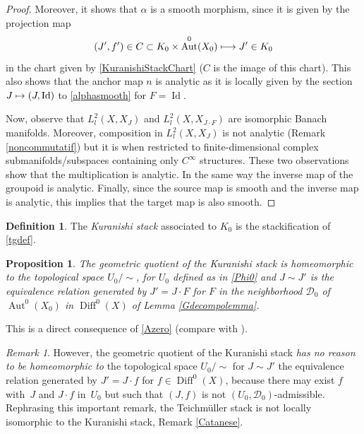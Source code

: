 \documentclass[10pt]{amsart}
\let\mathcal\mathscr
\def\mto{\mathchoice{\longmapsto}{\mapsto}{\mapsto}{\mapsto}}
\DeclareMathOperator{\Aut}{Aut}
\DeclareMathOperator{\Diff}{Diff}
\DeclareMathOperator{\Id}{Id}
\theoremstyle{plain}
\newtheorem{proposition}[theorem]{Proposition}
\theoremstyle{definition}
\newtheorem{definition}[theorem]{Definition}
\theoremstyle{remark}
\newtheorem{remark}[theorem]{Remark}
\numberwithin{equation}{section}
\newcommand{\Azero}{\Aut^0(X_0)}
\newcommand{\D}{\Diff^0(X)}
\begin{document}
\begin{proof}
Moreover, it shows that $\alpha$ is a smooth morphism, since it is given by the projection map
\begin{equation}
\label{alphasmooth}
(J',f')\in C\subset K_0\times\Azero\mto J'\in K_0
\end{equation}
in the chart given by \eqref{KuranishiStackChart} ($C$ is the image of this chart). This also shows that the anchor map $n$ is analytic as it is locally given by the section $J\mto (J,\Id)$ to \eqref{alphasmooth} for $F=\Id$.

Now, observe that $L^2_l(X,X_J)$ and $L^2_l(X,X_{J\cdot F})$ are isomorphic Banach manifolds. Moreover, composition in $L^2_l(X,X_J)$ is not analytic (\cf Remark \ref{noncommutatif}) but it is when restricted to finite-dimensional complex submanifolds/subspaces containing only $C^\infty$ structures. These two observations show that the multiplication is analytic. In the same way the inverse map of the groupoid is analytic. Finally, since the source map is smooth and the inverse map is analytic, this implies that the target map is also smooth.
\end{proof}
\begin{definition}
The \emph{Kuranishi stack} associated to $K_0$ is the stackification of \eqref{tgdef}.
\end{definition}

\begin{proposition}
\label{geometricquotient}
The geometric quotient of the Kuranishi stack is homeomorphic to the topological space $U_0/\sim$, for $U_0$ defined as in \eqref{Phi0} and $J\sim J'$ is the equivalence relation generated by $J'=J\cdot F$ for $F$ in the neighborhood $\mathcal D_0$ of $\Azero$ in $\D$ of Lemma \ref{Gdecompolemma}.
\end{proposition}

This is a direct consequence of \eqref{Azero} (compare with \cite{KuranishiNote}).

\begin{remark}
\label{localmodeldifference}
However, the geometric quotient of the Kuranishi stack \emph{has no reason to be homeomorphic to} the topological space $U_0/\sim$ for $J\sim J'$ the equivalence relation generated by $J'=J\cdot f$ for $f\in\D$, because there may exist $f$ with~$J$ and $J\cdot f$ in~$U_0$ but such that $(J,f)$ is not $(U_0,\mathcal D_0)$-admissible. Rephrasing this important remark, the Teichmüller stack is not locally isomorphic to the Kuranishi stack, \cf Remark \ref{Catanese}.
\end{remark}
\end{document}
